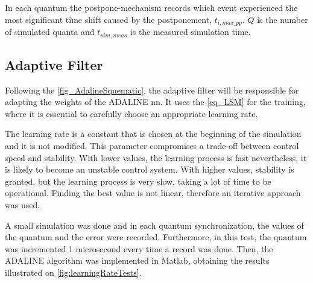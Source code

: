 In each quantum the postpone-mechanism records which event experienced the most significant time shift caused by the postponement, 
$t_{i,max\_pp}$. $Q$ is the number of simulated quanta and $t_{sim,meas}$ is the measured simulation time. 


\subsection{Adaptive Filter}

Following the \autoref{fig_AdalineSquematic}, the adaptive filter will be responsible for adapting the weights of the ADALINE \gls{nn}. It uses 
the \autoref{eq_LSM} for the training, where it is essential to carefully choose an appropriate learning rate.

The learning rate is a constant that is chosen at the beginning of the simulation and it is not modified. This parameter compromises a trade-off 
between control speed and stability. With lower values, the learning process is fast nevertheless, it is likely to become an unstable control 
system. With higher values, stability is granted, but the learning process is very slow, taking a lot of time to be operational.
Finding the best value is not linear, therefore an iterative approach was used. 

A small simulation was done and in each quantum synchronization, the values of the quantum and the error were recorded. Furthermore, 
in this test, the quantum was incremented 1 microsecond every time a record was done. Then, the ADALINE algorithm was implemented in Matlab, 
obtaining the results illustrated on \autoref{fig:learningRateTests}.


